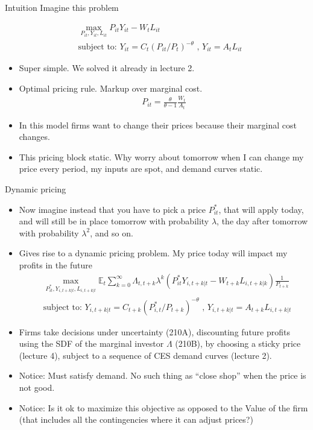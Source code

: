 \documentclass[11pt,aspectratio=169,xcolor={dvipsnames},hyperref={pdftex,pdfpagemode=UseNone,hidelinks,pdfdisplaydoctitle=true},usepdftitle=false]{beamer}
\begin{document}
\begin{frame}{Intuition}
Imagine this problem

\begin{align}
& \max_{P_{it},Y_{it}, L_{it}} P_{it} Y_{it} - W_t L_{it}\\
& \text{subject to:   } Y_{it} = C_t (P_{it}/P_t)^{-\theta} \text{  ,  } Y_{it} = A_t L_{it}
\end{align}
\begin{itemize}
\pause
\item Super simple. We solved it already in lecture 2.
\pause
\item Optimal pricing rule. Markup over marginal cost.
\begin{align*}
P_{it} = \frac{\theta}{\theta-1} \frac{W_t}{A_t}
\end{align*}
\pause
\item In this model firms want to change their prices because their marginal cost changes.
\pause
\item This pricing block static. Why worry about tomorrow when I can change my price every period, my inputs are spot, and demand curves static.
\end{itemize}
\end{frame}


\begin{frame}{Dynamic pricing}
\begin{itemize}
\item Now imagine instead that you have to pick a price $P_{it}^*$, that will apply today, and will still be in place tomorrow with probability $\lambda$, the day after tomorrow with probability $\lambda^2$, and so on.
\pause
\item Gives rise to a dynamic pricing problem. My price today will impact my profits in the future
\begin{align*}
&\max_{P^*_{it},Y_{i,t+k|t}, L_{i,t+k|t}} \mathbb{E}_t \sum_{k=0}^{\infty} \Lambda_{t,t+k} \lambda^k \left(P^*_{it} Y_{i,t+k|t} - W_{t+k} L_{i,t+k|k}\right) \frac{1}{P_{t+k}}\\
& \text{subject to:  } Y_{i,t+k|t} = C_{t+k} (P^*_{i,t}/P_{t+k})^{-\theta} \text{  ,  } Y_{i,t+k|t} = A_{t+k} L_{i,t+k|t}
\end{align*}
\pause
\item Firms take decisions under uncertainty (210A), discounting future profits using the SDF of the marginal investor $\Lambda$ (210B), by choosing a sticky price (lecture 4), subject to a sequence of CES demand curves (lecture 2).
\pause
\item Notice: Must satisfy demand. No such thing as ``close shop'' when the price is not good.
\pause
\item Notice: Is it ok to maximize this objective as opposed to the Value of the firm (that includes all the contingencies where it can adjust prices?)
\pause
\end{itemize}
\end{frame}
\end{document}
